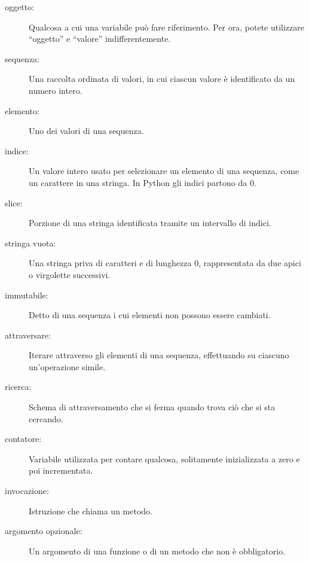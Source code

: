 \documentclass[10pt]{book}
\begin{document}
\begin{description}

\item[oggetto:] Qualcosa a cui una variabile può fare riferimento. Per ora, potete utilizzare ``oggetto'' e ``valore'' indifferentemente.

\item[sequenza:] Una raccolta ordinata di valori, in cui ciascun valore è identificato da un numero intero.

\item[elemento:] Uno dei valori di una sequenza.

\item[indice:] Un valore intero usato per selezionare un elemento di una sequenza, come un carattere in una stringa. In Python gli indici partono da 0.

\item[slice:] Porzione di una stringa identificata tramite un intervallo di indici.

\item[stringa vuota:] Una stringa priva di caratteri e di lunghezza 0, rappresentata da due apici o virgolette successivi.

\item[immutabile:] Detto di una sequenza i cui elementi non possono essere cambiati.

\item[attraversare:] Iterare attraverso gli elementi di una sequenza, effettuando su ciascuno un'operazione simile.

\item[ricerca:] Schema di attraversamento che si ferma quando trova ciò che si sta cercando.

\item[contatore:] Variabile utilizzata per contare qualcosa, solitamente inizializzata a zero e poi incrementata.

\item[invocazione:] Istruzione che chiama un metodo.

\item[argomento opzionale:] Un argomento di una funzione o di un metodo che non è obbligatorio.

\end{description}
\end{document}
